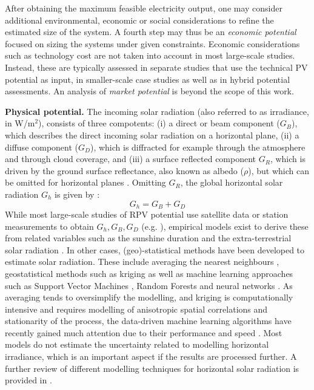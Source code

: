 After obtaining the maximum feasible electricity output, one may consider additional environmental, economic or social considerations to refine the estimated size of the system. A fourth step may thus be an \textit{economic potential} focused on sizing the systems under given constraints. Economic considerations such as technology cost are not taken into account in most large-scale studies. Instead, these are typically assessed in separate studies that use the technical PV potential as input, in smaller-scale case studies as well as in hybrid potential assessments. An analysis of \textit{market potential} is beyond the scope of this work. 

\textbf{Physical potential.} The incoming solar radiation (also referred to as irradiance, in W/m$^2$), consists of three compotents: (i) a direct or beam component ($G_B$), which describes the direct incoming solar radiation on a horizontal plane, (ii) a diffuse component ($G_D$), which is diffracted for example through the atmosphere and through cloud coverage, and (iii) a surface reflected component $G_R$, which is driven by the ground surface reflectance, also known as albedo ($\rho$), but which can be omitted for horizontal planes \cite{assouline_estimation_2017}. Omitting $G_R$, the global horizontal solar radiation $G_h$ is given by \cite{assouline_estimation_2017}:
\begin{equation}
\label{eq:Gh_method}
G_{h} = G_{B} + G_{D}
\end{equation}
While most large-scale studies of RPV potential use satellite data or station measurements to obtain $G_h, G_B, G_D$ (e.g. \cite{bodis_high-resolution_2019,buffat_scalable_2018,ramirez_camargo_spatio-temporal_2015,calcabrini_simplified_2019}), empirical models exist to derive these from related variables such as the sunshine duration and the extra-terrestrial solar radiation \cite{assouline_estimation_2017}. 
In other cases, (geo)-statistical methods have been developed to estimate solar radiation. 
These include averaging the nearest neighbours \cite{klauser_solarpotentialanalyse_2016}, geostatistical methods such as kriging \cite{alsamamra_comparative_2009,rehman_spatial_2000} as well as machine learning approaches such as Support Vector Machines \cite{assouline_quantifying_2017}, Random Forests \cite{assouline_large-scale_2018} and neural networks \cite{hocaoglu_hourly_2008,notton_neural_2013,sahin_application_2013}. As averaging tends to oversimplify the modelling, and kriging is computationally intensive and requires modelling of anisotropic spatial correlations and stationarity of the process, the data-driven machine learning algorithms have recently gained much attention due to their performance and speed \cite{kanevski_machine_2009}. 
Most models do not estimate the uncertainty related to modelling horizontal irradiance, which is an important aspect if the results are processed further.
A further review of different modelling techniques for horizontal solar radiation is provided in \cite{zhang_review_2018}.

